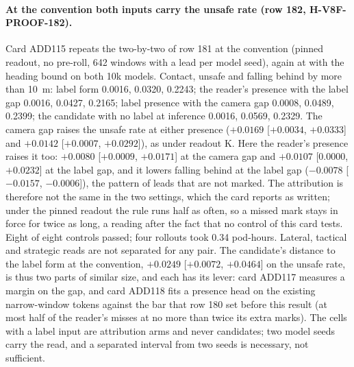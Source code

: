 \paragraph{At the convention both inputs carry the unsafe rate (row 182, H-V8F-PROOF-182).} Card ADD115 repeats the two-by-two of row 181 at the convention (pinned readout, no pre-roll, 642 windows with a lead per model seed), again at  with the heading bound on both 10k models. Contact, unsafe and falling behind by more than 10~m: label form 0.0016, 0.0320, 0.2243; the reader's presence with the label gap 0.0016, 0.0427, 0.2165; label presence with the camera gap 0.0008, 0.0489, 0.2399; the candidate with no label at inference 0.0016, 0.0569, 0.2329. The camera gap raises the unsafe rate at either presence ($+0.0169$ [$+0.0034$, $+0.0333$] and $+0.0142$ [$+0.0007$, $+0.0292$]), as under readout K. Here the reader's presence raises it too: $+0.0080$ [$+0.0009$, $+0.0171$] at the camera gap and $+0.0107$ [0.0000, $+0.0232$] at the label gap, and it lowers falling behind at the label gap ($-0.0078$ [$-0.0157$, $-0.0006$]), the pattern of leads that are not marked. The attribution is therefore not the same in the two settings, which the card reports as written; under the pinned readout the rule runs half as often, so a missed mark stays in force for twice as long, a reading after the fact that no control of this card tests. Eight of eight controls passed; four rollouts took 0.34 pod-hours. Lateral, tactical and strategic reads are not separated for any pair. The candidate's distance to the label form at the convention, $+0.0249$ [$+0.0072$, $+0.0464$] on the unsafe rate, is thus two parts of similar size, and each has its lever: card ADD117 measures a margin on the gap, and card ADD118 fits a presence head on the existing narrow-window tokens against the bar that row 180 set before this result (at most half of the reader's misses at no more than twice its extra marks). The cells with a label input are attribution arms and never candidates; two model seeds carry the read, and a separated interval from two seeds is necessary, not sufficient.

